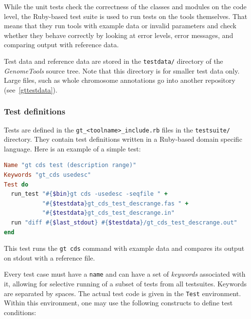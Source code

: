 \documentclass[11pt,final]{article}
\newcommand{\keyword}[1]{\lstinline{#1}}
\newcommand{\Gt}[0]{\emph{GenomeTools}\xspace}
\begin{document}
While the unit tests check the correctness of the classes and modules on the
code level, the Ruby-based test suite is used to run tests on the tools
themselves. That means that they run tools with example data or invalid
parameters and check whether they behave correctly by looking at error levels,
error messages, and comparing output with reference data.

Test data and reference data are stored in the \keyword{testdata/} directory
of the \Gt source tree. Note that this directory is for smaller test data only.
Large files, such as whole chromosome annotations go into another repository
(see~\ref{gttestdata}).

\subsubsection{Test definitions}
\label{testdefinitions}

Tests are defined in the \keyword{gt_<toolname>_include.rb} files in the
\keyword{testsuite/} directory. They contain test definitions written in a
Ruby-based domain specific language. Here is an example of a simple test:

\begin{lstlisting}[language=Ruby]
Name "gt cds test (description range)"
Keywords "gt_cds usedesc"
Test do
  run_test "#{$bin}gt cds -usedesc -seqfile " +
           "#{$testdata}gt_cds_test_descrange.fas " +
           "#{$testdata}gt_cds_test_descrange.in"
  run "diff #{$last_stdout} #{$testdata}/gt_cds_test_descrange.out"
end
\end{lstlisting}%

This test runs the \keyword{gt cds} command with example data and compares its
output on stdout with a reference file.

Every test case must have a \keyword{name} and can have a set of \emph{keywords}
associated with it, allowing for selective running of a subset of tests from
all testsuites. Keywords are separated by spaces.
The actual test code is given in the \keyword{Test} environment.
Within this environment, one may use the following constructs to define test
conditions:
\end{document}
